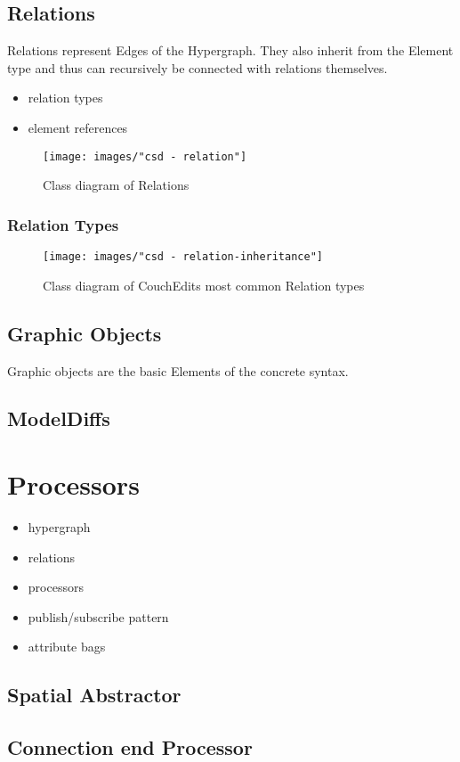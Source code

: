 \subsection{Relations}
Relations represent Edges of the Hypergraph. They also inherit from the Element type and thus can recursively be connected with relations themselves. 


\begin{itemize}
  \item relation types
  \item element references 
\end{itemize}



\begin{figure}
  \centering
  \texttt{[image: images/"csd - relation"]}
  \caption{Class diagram of Relations}
  \label{fig:relations}
\end{figure}

\subsubsection{Relation Types}


\begin{figure}
  \centering
  \texttt{[image: images/"csd - relation-inheritance"]}
  \caption{Class diagram of CouchEdits most common Relation types}
  \label{fig:relations_inheritance}
\end{figure}


\subsection{Graphic Objects}
Graphic objects are the basic Elements of the concrete syntax. 

\subsection{ModelDiffs}


\section{Processors}




\begin{itemize}
  \item hypergraph
  \item relations
  \item processors
  \item publish/subscribe pattern
  \item attribute bags
\end{itemize}

\subsection{Spatial Abstractor}

\subsection{Connection end Processor}